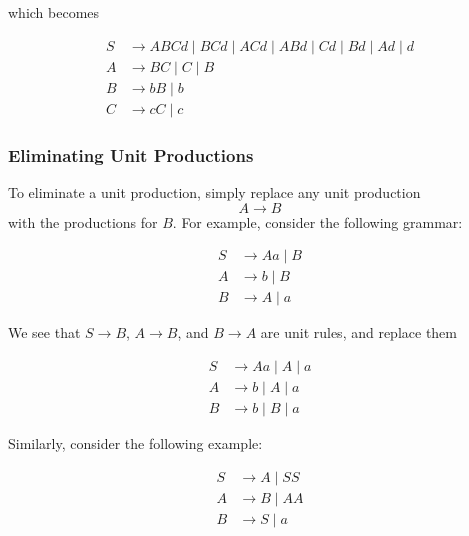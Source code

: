 which becomes 

\begin{align*}
    S &\to ABCd \mid BCd \mid ACd \mid ABd \mid Cd \mid Bd \mid Ad \mid d\\
    A &\to BC \mid C \mid B\\
    B &\to bB \mid b \\
    C &\to cC \mid c
\end{align*}

\subsubsection{Eliminating Unit Productions}\label{subsubsec:eliminating-unit-productions}

To eliminate a unit production, simply replace any unit production \[A\to B\] with the productions for \(B\). For example, consider the following grammar:

\begin{align*}
    S &\to Aa \mid B\\
    A &\to b \mid B\\
    B &\to A \mid a
\end{align*}

We see that \(S\to B\), \(A\to B\), and \(B\to A\) are unit rules, and replace them

\begin{align*}
    S &\to Aa \mid A \mid a\\
    A &\to b \mid A \mid a\\
    B &\to b \mid B \mid a
\end{align*}

Similarly, consider the following example:

\begin{align*}
    S &\to A\mid SS\\
    A &\to B\mid AA\\
    B &\to S\mid a
\end{align*}

